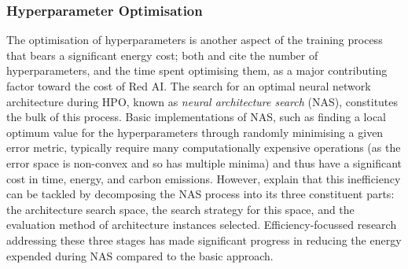 \documentclass[a4paper, 12pt]{article}
\begin{document}
    \subsubsection{Hyperparameter Optimisation}

    The optimisation of hyperparameters is another aspect of the training process that bears a significant energy cost; both \citet{schwartz-2019} and \citet{lacoste-2019} cite the number of hyperparameters, and the time spent optimising them, as a major contributing factor toward the cost of Red AI. The search for an optimal neural network architecture during HPO, known as \emph{neural architecture search} (NAS), constitutes the bulk of this process. Basic implementations of NAS, such as finding a local optimum value for the hyperparameters through randomly minimising a given error metric, typically require many computationally expensive operations (as the error space is non-convex and so has multiple minima) and thus have a significant cost in time, energy, and carbon emissions. However, \citet{xu-2021} explain that this inefficiency can be tackled by decomposing the NAS process into its three constituent parts: the architecture search space, the search strategy for this space, and the evaluation method of architecture instances selected. Efficiency-focussed research addressing these three stages has made significant progress in reducing the energy expended during NAS compared to the basic approach. 
\end{document}
